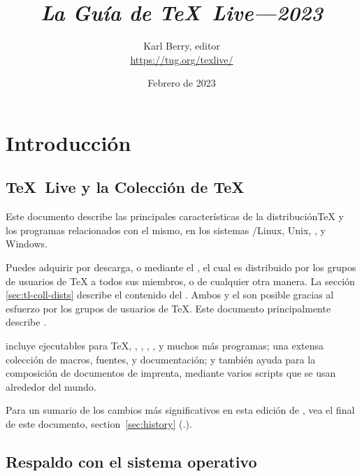 \documentclass{article}
\begin{document}
\title{%
{\huge \textit{La Guía de \TeX\ Live---2023}}}

\author{Karl Berry, editor \\[3mm]
        \url{https://tug.org/texlive/}}

\date{Febrero de 2023}

\maketitle

\begin{multicols}{2}
\tableofcontents
\end{multicols}

\section{Introducción}
\label{sec:intro}

\subsection{\TeX\ Live y la Colección de \TeX\ }


Este documento describe las principales características de la
distribución\Dash \TeX{} y los programas relacionados con el mismo, en
los sistemas \GNU/Linux, Unix, \macOS, y Windows.

Puedes adquirir \TL{} por descarga, o mediante el \TK{} \DVD, el
cual es distribuido por los grupos de usuarios de \TeX{} a todos sus
miembros, o de cualquier otra manera. La sección
\ref{sec:tl-coll-dists} describe el contenido del \DVD{}. Ambos \TL{} y
el \TK{} son posible gracias al esfuerzo por los grupos de usuarios de
\TeX{}. Este documento principalmente describe \TL{}.

\TL{} incluye ejecutables para \TeX{}, \LaTeXe{}, \ConTeXt, \MF, \MP,
\BibTeX{} y muchos más programas; una extensa colección de macros,
fuentes, y documentación; y también ayuda para la composición de
documentos de imprenta, mediante varios scripts que se usan alrededor
del mundo.

Para un sumario de los cambios más significativos en esta edición de
\TL{}, vea el final de este documento, section~\ref{sec:history}
(\p.\pageref{sec:history}).

\subsection{Respaldo con el sistema operativo}
\label{sec:os-support}
\end{document}
